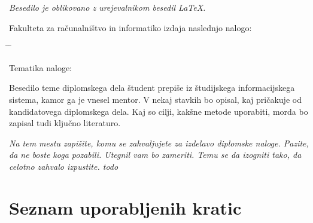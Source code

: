 \documentclass[a4paper, 12p]{book}
\newcommand{\clearemptydoublepage}{\newpage{\pagestyle{empty}\cleardoublepage}}
\begin{document}
\begin{center}
\mbox{}\vfill
\emph{Besedilo je oblikovano z urejevalnikom besedil \LaTeX.}
\end{center}
\clearemptydoublepage

\thispagestyle{empty}
\vspace*{4cm}

\noindent
Fakulteta za računalništvo in informatiko izdaja naslednjo nalogo:
\medskip
\begin{tabbing}
\hspace{32mm}\= \hspace{6cm} \= \kill




Tematika naloge:
\end{tabbing}
Besedilo teme diplomskega dela študent prepiše iz študijskega informacijskega sistema, kamor ga je vnesel mentor. V nekaj stavkih bo opisal, kaj pričakuje od kandidatovega diplomskega dela. Kaj so cilji, kakšne metode uporabiti, morda bo zapisal tudi ključno literaturo.
\vspace{15mm}






\vspace{2cm}

\clearemptydoublepage

\thispagestyle{empty}\mbox{}\vfill\null\it%
\noindent
Na tem mestu zapišite, komu se zahvaljujete za izdelavo diplomske naloge. Pazite, da ne boste koga pozabili. Utegnil vam bo zameriti. Temu se da izogniti tako, da celotno zahvalo izpustite. todo
\rm\normalfont

\clearemptydoublepage

\pagestyle{empty}
\def\thepage{}%
\tableofcontents{}


\clearemptydoublepage


\chapter*{Seznam uporabljenih kratic}  %
\end{document}
